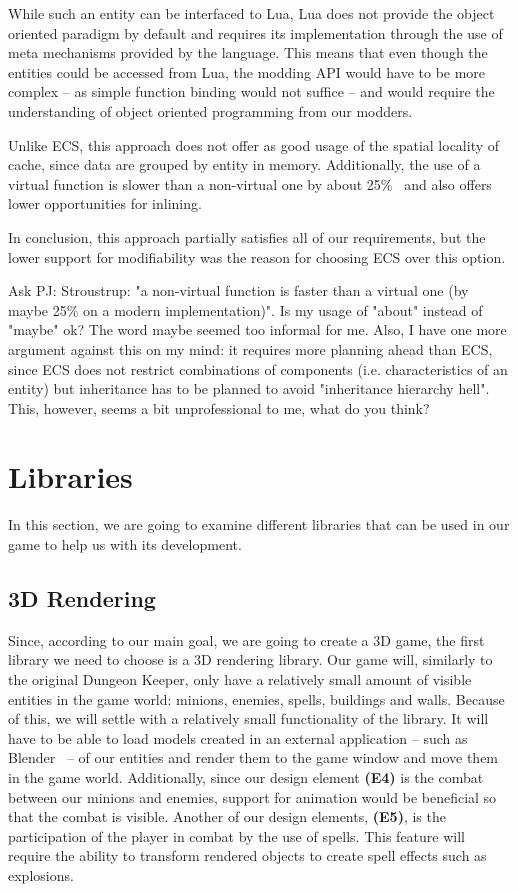 While such an entity can be interfaced to Lua, Lua does not provide the object oriented paradigm by default and requires its implementation
through the use of meta mechanisms provided by the language. This means that even though the entities could be accessed from Lua, the
modding API would have to be more complex -- as simple function binding would not suffice -- and would require the understanding
of object oriented programming from our modders.

Unlike ECS, this approach does not offer as good usage of the spatial locality of cache, since data are grouped by entity in memory.
Additionally, the use of a virtual function is slower than a non-virtual one by about 25\%~\cite{CppProgLang} and also offers lower 
opportunities for inlining.

In conclusion, this approach partially satisfies all of our requirements, but the lower support for modifiability was the reason
for choosing ECS over this option.

\bigskip
Ask PJ: Stroustrup: "a non-virtual function is faster than a virtual one (by maybe 25\% on a modern implementation)".
Is my usage of "about" instead of "maybe" ok? The word maybe seemed too informal for me.
Also, I have one more argument against this on my mind: it requires more planning ahead than ECS, since ECS does not
restrict combinations of components (i.e. characteristics of an entity) but inheritance has to be planned to avoid
"inheritance hierarchy hell". This, however, seems a bit unprofessional to me, what do you think?

\section{Libraries}

In this section, we are going to examine different libraries that can be used in our game
to help us with its development.

\subsection{3D Rendering}

Since, according to our main goal, we are going to create a 3D game, the first library we need to choose is a 3D rendering library.
Our game will, similarly to the original Dungeon Keeper, only have a relatively small amount of visible entities in the game world: 
minions, enemies, spells, buildings and walls. Because of this, we will settle with a relatively small functionality of the library.
It will have to be able to load models created in an external application -- such as Blender~\cite{Blender} --  of our entities and render
them to the game window and move them in the game world.
Additionally, since our design element \textbf{(E4)} is the combat between our minions and enemies, support for animation would be
beneficial so that the combat is visible. Another of our design elements, \textbf{(E5)}, is the participation of the player in combat
by the use of spells. This feature will require the ability to transform rendered objects to create spell effects such as explosions.

